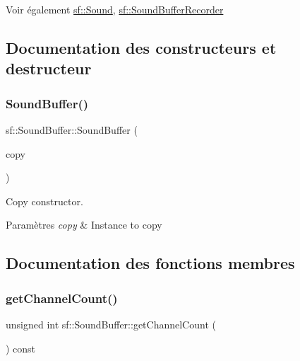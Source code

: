 \begin{DoxySeeAlso}{Voir également}
\hyperlink{classsf_1_1Sound}{sf\+::\+Sound}, \hyperlink{classsf_1_1SoundBufferRecorder}{sf\+::\+Sound\+Buffer\+Recorder} 
\end{DoxySeeAlso}


\subsection{Documentation des constructeurs et destructeur}
\mbox{\label{classsf_1_1SoundBuffer_aaf000fc741ff27015907e8588263f4a6}} 
\subsubsection{\texorpdfstring{Sound\+Buffer()}{SoundBuffer()}}
{\footnotesize\ttfamily sf\+::\+Sound\+Buffer\+::\+Sound\+Buffer (\begin{DoxyParamCaption}\item[{const \hyperlink{classsf_1_1SoundBuffer}{Sound\+Buffer} \&}]{copy }\end{DoxyParamCaption})}



Copy constructor. 


\begin{DoxyParams}{Paramètres}
{\em copy} & Instance to copy \\
\hline
\end{DoxyParams}


\subsection{Documentation des fonctions membres}
\mbox{\label{classsf_1_1SoundBuffer_a127707b831d875ed790eef1aa2b9fcc3}} 
\subsubsection{\texorpdfstring{get\+Channel\+Count()}{getChannelCount()}}
{\footnotesize\ttfamily unsigned int sf\+::\+Sound\+Buffer\+::get\+Channel\+Count (\begin{DoxyParamCaption}{ }\end{DoxyParamCaption}) const}



